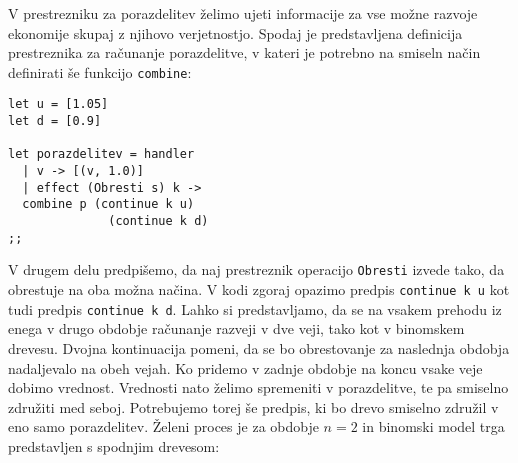 \documentclass[a4paper,12pt]{article}
\theoremstyle{definition} %
\begin{document}
V prestrezniku za porazdelitev želimo ujeti informacije za vse možne razvoje ekonomije skupaj z njihovo verjetnostjo. Spodaj je predstavljena definicija prestreznika za računanje porazdelitve, v kateri je potrebno na smiseln način definirati še funkcijo \lstinline{combine}:
\begin{lstlisting}
let u = [1.05]
let d = [0.9]

let porazdelitev = handler
  | v -> [(v, 1.0)]
  | effect (Obresti s) k -> 
  combine p (continue k u)
		      (continue k d)
;;
\end{lstlisting}
V drugem delu predpišemo, da naj prestreznik operacijo \lstinline{Obresti} izvede tako, da obrestuje na oba možna načina. V kodi zgoraj opazimo predpis \lstinline{continue k u} kot tudi predpis \lstinline{continue k d}. Lahko si predstavljamo, da se na vsakem prehodu iz enega v drugo obdobje računanje razveji v dve veji, tako kot v binomskem drevesu. Dvojna kontinuacija pomeni, da se bo obrestovanje za naslednja obdobja nadaljevalo na obeh vejah. Ko pridemo v zadnje obdobje na koncu vsake veje dobimo vrednost. Vrednosti nato želimo spremeniti v porazdelitve, te pa smiselno združiti med seboj. Potrebujemo torej še predpis, ki bo drevo smiselno združil v eno samo porazdelitev. Želeni proces je za obdobje $n = 2$ in binomski model trga predstavljen s spodnjim drevesom:
\begin{center}
\end{center}
\end{document}
